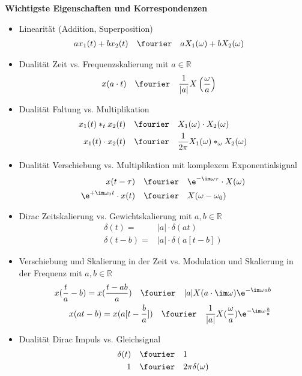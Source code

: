 \noindent \textbf{Wichtigste Eigenschaften und Korrespondenzen}
\begin{itemize}
\item Linearität (Addition, Superposition)
\begin{align}
a x_1(t) + b x_2(t) &\quad \fourier \quad a X_1(\omega) + b X_2(\omega)
\end{align}

\item Dualität Zeit vs. Frequenzskalierung mit $a\in\mathbb{R}$
\begin{align}
x(a \cdot t) &\quad \fourier \quad \frac{1}{|a|}X\left(\frac{\omega}{a}\right)
\end{align}

\item Dualität Faltung vs. Multiplikation
\begin{align}
x_1(t) \ast_t x_2(t) &\quad \fourier \quad X_1(\omega) \cdot X_2(\omega)\\
x_1(t) \cdot x_2(t) &\quad \fourier \quad \frac{1}{2\pi} X_1(\omega) \ast_\omega X_2(\omega)
\end{align}

\item Dualität Verschiebung vs. Multiplikation mit komplexem Exponentialsignal
\begin{align}
x(t-\tau) &\quad \fourier \quad \e^{-\im\omega\tau} \cdot X(\omega)\\
\e^{+\im\omega_0 t} \cdot x(t) &\quad \fourier \quad X(\omega-\omega_0)
\end{align}

\item Dirac Zeitskalierung vs. Gewichtskalierung
mit $a,b\in\mathbb{R}$
\begin{align}
\delta(t) =& |a| \cdot \delta(a t)\\
\delta(t-b) = & |a| \cdot \delta(a [t-b])
\end{align}

\item Verschiebung und Skalierung in der Zeit vs. Modulation und Skalierung in der Frequenz
mit $a,b\in\mathbb{R}$
\begin{align}
x(\frac{t}{a}-b)  = x(\frac{t-a b}{a}) \quad\fourier\quad
|a| X(a \cdot \im\omega) \e^{-\im\omega a b}\\
x(a t - b)  = x(a [t-\frac{b}{a}]) \quad\fourier\quad
\frac{1}{|a|} X(\frac{\omega}{a}) \e^{-\im\omega \frac{b}{a}}
\end{align}

\item Dualität Dirac Impuls vs. Gleichsignal
\begin{align}
\delta(t) &\quad \fourier \quad 1\\
1 &\quad \fourier \quad 2\pi\delta(\omega)
\end{align}


\end{itemize}
